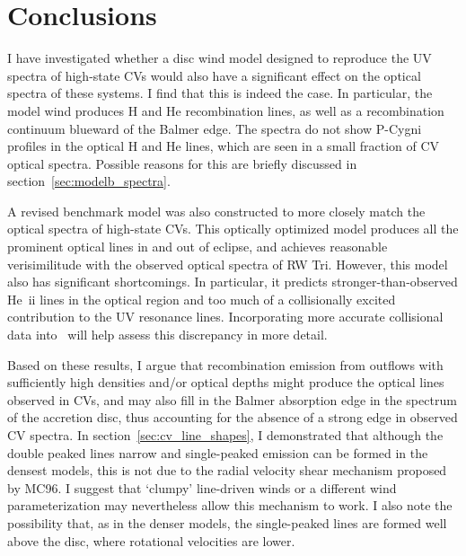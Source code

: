 %
%


\section{Conclusions}
\label{sec:cv_conclusions}

I have investigated whether a disc wind model designed to reproduce
the UV spectra of high-state CVs would also have a significant effect
on the optical spectra of these systems. I find that this is indeed
the case. In particular, the model wind produces H and He
recombination lines, as well as a recombination continuum blueward of
the Balmer edge. The spectra do not show P-Cygni profiles
in the optical H and He lines, which are seen in a small fraction of CV 
optical spectra. Possible reasons for this are briefly discussed in 
section~\ref{sec:modelb_spectra}.

A revised benchmark model was also constructed
to more closely match the optical spectra of high-state CVs. This
optically optimized model produces all the prominent optical lines in
and out of eclipse, and achieves reasonable verisimilitude with the
observed optical spectra of RW Tri. However, this model also has
significant shortcomings. In particular, it predicts
stronger-than-observed He~{\sc ii} lines in the optical region and too
much of a collisionally excited contribution to the UV resonance lines. 
Incorporating more accurate collisional data into \py\ will help
assess this discrepancy in more detail.

Based on these results, I argue that recombination emission 
from outflows with sufficiently high densities and/or optical depths 
might produce the optical lines observed in CVs, and may also 
fill in the Balmer absorption edge in the spectrum of the accretion disc, 
thus accounting for the absence of a strong edge in observed CV spectra.
In section~\ref{sec:cv_line_shapes}, I demonstrated that
although the double peaked lines narrow and 
single-peaked emission can be formed in the densest models, 
this is not due to the radial velocity shear mechanism proposed by MC96.
I suggest that `clumpy' line-driven winds or a different
wind parameterization may nevertheless allow this mechanism to work.
I also note the possibility that, as in the denser models, 
the single-peaked lines are formed well above the disc, where 
rotational velocities are lower.

